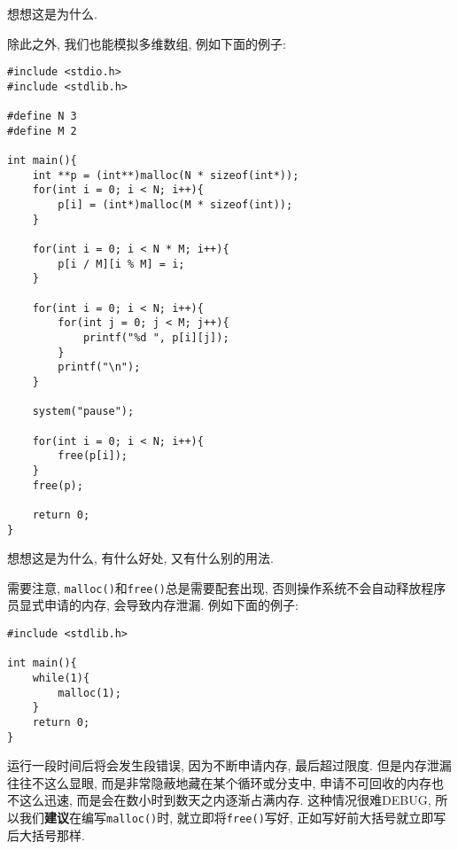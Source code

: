         想想这是为什么.

        除此之外, 我们也能模拟多维数组, 例如下面的例子:
\begin{lstlisting}
#include <stdio.h>
#include <stdlib.h>

#define N 3
#define M 2

int main(){
    int **p = (int**)malloc(N * sizeof(int*));
    for(int i = 0; i < N; i++){
        p[i] = (int*)malloc(M * sizeof(int));
    }

    for(int i = 0; i < N * M; i++){
        p[i / M][i % M] = i;
    }

    for(int i = 0; i < N; i++){
        for(int j = 0; j < M; j++){
            printf("%d ", p[i][j]);
        }
        printf("\n");
    }

    system("pause");

    for(int i = 0; i < N; i++){
        free(p[i]);
    }
    free(p);

    return 0;
}
\end{lstlisting}

        想想这是为什么, 有什么好处, 又有什么别的用法.

        需要注意, \texttt{malloc()}和\texttt{free()}总是需要配套出现, 否则操作系统不会自动释放程序员显式申请的内存, 会导致内存泄漏. 例如下面的例子:
\begin{lstlisting}
#include <stdlib.h>

int main(){
    while(1){
        malloc(1);
    }
    return 0;
}
\end{lstlisting}
        运行一段时间后将会发生段错误, 因为不断申请内存, 最后超过限度. 但是内存泄漏往往不这么显眼, 而是非常隐蔽地藏在某个循环或分支中, 申请不可回收的内存也不这么迅速, 而是会在数小时到数天之内逐渐占满内存. 这种情况很难DEBUG, 所以我们\textbf{建议}在编写\texttt{malloc()}时, 就立即将\texttt{free()}写好, 正如写好前大括号就立即写后大括号那样.